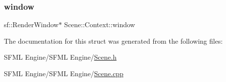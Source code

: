 \subsubsection{\texorpdfstring{window}{window}}
{\footnotesize\ttfamily sf\+::\+Render\+Window$\ast$ Scene\+::\+Context\+::window}



The documentation for this struct was generated from the following files\+:\begin{DoxyCompactItemize}
\item 
S\+F\+M\+L Engine/\+S\+F\+M\+L Engine/\hyperlink{_scene_8h}{Scene.\+h}\item 
S\+F\+M\+L Engine/\+S\+F\+M\+L Engine/\hyperlink{_scene_8cpp}{Scene.\+cpp}\end{DoxyCompactItemize}
